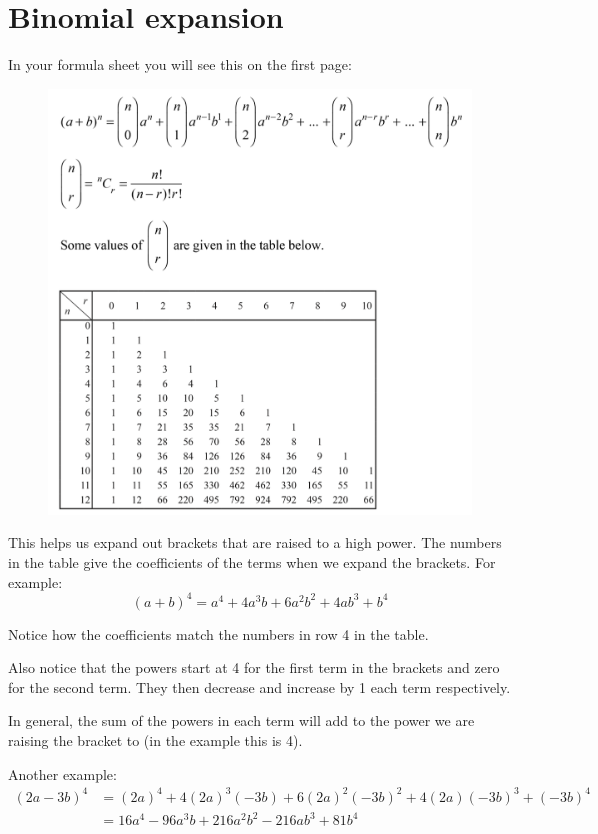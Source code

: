 \documentclass[../main.tex]{subfiles}
\begin{document}
\section{Binomial expansion}
In your formula sheet you will see this on the first page:
\begin{figure}[h]
    \centering
    \includegraphics[width=0.75\linewidth]{images/binomial.png}
\end{figure}

This helps us expand out brackets that are raised to a high power.
The numbers in the table give the coefficients of the terms when we expand the brackets.
For example:
\[(a + b)^4 = a^4 + 4a^3 b + 6a^2 b^2 + 4a b^3 + b^4\]

Notice how the coefficients match the numbers in row 4 in the table.

Also notice that the powers start at 4 for the first term in the brackets and zero for the second term. They then decrease and increase by 1 each term respectively.

In general, the sum of the powers in each term will add to the power we are raising the bracket to (in the example this is 4).

Another example:
\begin{equation*}
\begin{split}
    (2a - 3b)^4 &= (2a)^4 + 4(2a)^3 (-3b) + 6(2a)^2 (-3b)^2 + 4(2a)(-3b)^3 + (-3b)^4 \\
&= 16a^4 -96a^3 b + 216a^2 b^2 - 216ab^3 + 81b^4
\end{split}
\end{equation*}
\end{document}
